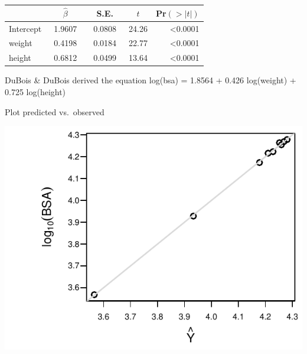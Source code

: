  \setlongtables\begin{longtable}{lrrrr}\hline
 \multicolumn{1}{l}{}&\multicolumn{1}{c}{$\hat{\beta}$}&\multicolumn{1}{c}{S.E.}&\multicolumn{1}{c}{$t$}&\multicolumn{1}{c}{Pr$(>|t|)$}\tabularnewline
 \hline
 \endhead
 \hline
 \endfoot
 Intercept&~1.9607~&~0.0808~&24.26&\textless 0.0001\tabularnewline
 weight&~0.4198~&~0.0184~&22.77&\textless 0.0001\tabularnewline
 height&~0.6812~&~0.0499~&13.64&\textless 0.0001\tabularnewline
 \hline
 \end{longtable}
 \addtocounter{table}{-1}

DuBois \& DuBois derived the equation log(bsa) = 1.8564 + 0.426
log(weight) + 0.725 log(height)

Plot predicted vs.\ observed
\begin{Schunk}


\centerline{\includegraphics{reg-dreg2-1} }

\end{Schunk}

